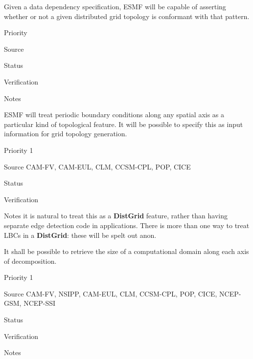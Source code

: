 
Given a data dependency specification, ESMF will be capable of
asserting whether or not a given distributed grid topology is
conformant with that pattern.

\begin{reqlist}
\item[Priority]
\item[Source]
\item[Status]
\item[Verification]
\item[Notes]
\end{reqlist}


ESMF will treat periodic boundary conditions along any spatial axis as
a particular kind of topological feature. It will be possible to
specify this as input information for grid topology generation.

\begin{reqlist}
\item[Priority] 1
\item[Source] CAM-FV, CAM-EUL, CLM, CCSM-CPL, POP, CICE
\item[Status]
\item[Verification]
\item[Notes] it is natural to treat this as a \textbf{DistGrid}
  feature, rather than having separate edge detection code in
  applications. There is more than one way to treat LBCs in a
  \textbf{DistGrid}: these will be spelt out anon.
\end{reqlist}




It shall be possible to retrieve the size of a computational domain
along each axis of decomposition.

\begin{reqlist}
\item[Priority] 1
\item[Source] CAM-FV, NSIPP, CAM-EUL, CLM, CCSM-CPL, POP, CICE, NCEP-GSM, NCEP-SSI
\item[Status]
\item[Verification]
\item[Notes]
\end{reqlist}


